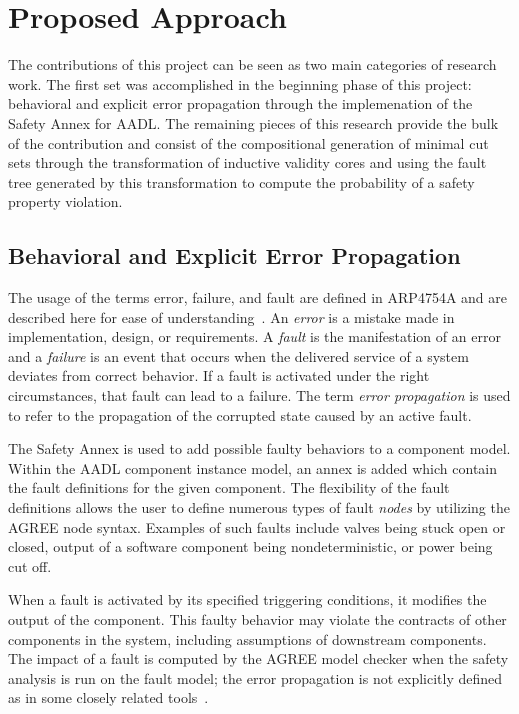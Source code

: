 \chapter{Proposed Approach}
\label{ch:prop}

The contributions of this project can be seen as two main categories of research work. The first set was accomplished in the beginning phase of this project: behavioral and explicit error propagation through the implemenation of the Safety Annex for AADL. The remaining pieces of this research provide the bulk of the contribution and consist of the compositional generation of minimal cut sets through the transformation of inductive validity cores and using the fault tree generated by this transformation to compute the probability of a safety property violation. 

\section{Behavioral and Explicit Error Propagation}
The usage of the terms error, failure, and fault are defined in ARP4754A and are described here for ease of understanding~\cite{SAE:ARP4754A}. An \textit{error} is a mistake made in implementation, design, or requirements. A \textit{fault} is the manifestation of an error and a \textit{failure} is an event that occurs when the delivered service of a system deviates from correct behavior. If a fault is activated under the right circumstances, that fault can lead to a failure. The term \textit{error propagation} is used to refer to the propagation of the corrupted state caused by an active fault. 

The Safety Annex is used to add possible faulty behaviors to a component model. Within the AADL component instance model, an annex is added which contain the fault definitions for the given component. The flexibility of the fault definitions allows the user to define numerous types of fault \textit{nodes} by utilizing the AGREE node syntax. Examples of such faults include valves being stuck open or closed, output of a software component being nondeterministic, or power being cut off.  

When a fault is activated by its specified triggering conditions, it modifies the output of the component. This faulty behavior may violate the contracts of other components in the system, including assumptions of downstream components. The impact of a fault is computed by the AGREE model checker when the safety analysis is run on the fault model; the error propagation is not explicitly defined as in some closely related tools~\cite{EMV2,compass30toolset}. 

